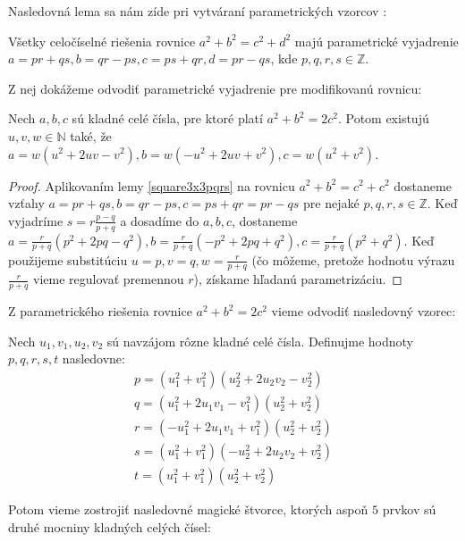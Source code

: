 Nasledovná lema sa nám zíde pri vytváraní parametrických vzorcov \cite{algebraic}:

\begin{lemma}
\label{square3x3pqrs}
Všetky celočíselné riešenia rovnice $a^2 + b^2 = c^2 + d^2$ majú parametrické vyjadrenie $a = pr + qs, b = qr - ps, c = ps + qr, d = pr - qs$, kde $p,q,r,s \in \mathbb{Z}$.
\end{lemma}

Z nej dokážeme odvodiť parametrické vyjadrenie pre modifikovanú rovnicu:

\begin{lemma} 
\label{square3x3uvw}
Nech $a,b,c$ sú kladné celé čísla, pre ktoré platí $a^2 + b^2 = 2c^2$. Potom existujú $u,v,w \in \mathbb{N}$ také, že $a = w(u^2 + 2uv - v^2), b = w(- u^2 + 2uv + v^2), c = w(u^2 + v^2)$.
\end{lemma}

\begin{proof} 
Aplikovaním lemy \ref{square3x3pqrs} na rovnicu $a^2 + b^2 = c^2 + c^2$ dostaneme vzťahy $a = pr + qs, b = qr - ps, c = ps + qr = pr - qs$ pre nejaké $p,q,r,s \in \mathbb{Z}$. Keď vyjadríme $s = r \frac{p-q}{p+q}$ a dosadíme do $a,b,c$, dostaneme $a =  \frac{r}{p+q} (p^2 + 2pq - q^2), b = \frac{r}{p+q} (-p^2 + 2pq + q^2), c = \frac{r}{p+q} (p^2 + q^2)$. Keď použijeme substitúciu $u = p, v = q, w = \frac{r}{p+q}$ (čo môžeme, pretože hodnotu výrazu $\frac{r}{p+q}$ vieme regulovať premennou $r$), získame hľadanú parametrizáciu.
\end{proof}

Z parametrického riešenia rovnice $a^2 + b^2 = 2c^2$ vieme odvodiť nasledovný vzorec:

\begin{theorem}
\label{3x3square5squares}
Nech $u_1, v_1, u_2, v_2$ sú navzájom rôzne kladné celé čísla. Definujme hodnoty $p,q,r,s,t$ nasledovne:
\begin{gather*}
p = (u_1^2 + v_1^2)(u_2^2 + 2u_2 v_2 - v_2^2) \\
q = (u_1^2 + 2u_1 v_1 - v_1^2)(u_2^2 + v_2^2) \\
r = (- u_1^2 + 2u_1 v_1 + v_1^2)(u_2^2 + v_2^2) \\
s = (u_1^2 + v_1^2)(-u_2^2 + 2u_2 v_2 + v_2^2) \\
t = (u_1^2 + v_1^2)(u_2^2 + v_2^2)
\end{gather*}

Potom vieme zostrojiť nasledovné magické štvorce, ktorých aspoň $5$ prvkov sú druhé mocniny kladných celých čísel:
\end{theorem}


